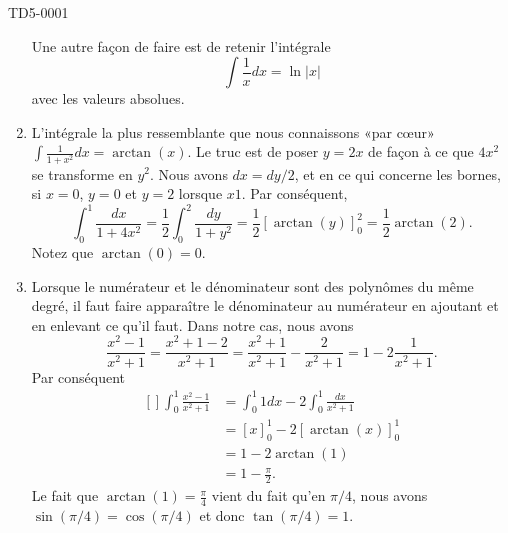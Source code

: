 \begin{corrige}{TD5-0001}
\begin{enumerate}
			Une autre façon de faire est de retenir l'intégrale
			\begin{equation}
				\int \frac{1}{ x }dx=\ln| x |
			\end{equation}
			avec les valeurs absolues.
		\item
			L'intégrale la plus ressemblante que nous connaissons «par cœur» $\int\frac{1}{ 1+x^2 }dx=\arctan(x)$. Le truc est de poser $y=2x$ de façon à ce que $4x^2$ se transforme en $y^2$. Nous avons $dx=dy/2$, et en ce qui concerne les bornes, si $x=0$, $y=0$ et $y=2$ lorsque $x1$. Par conséquent,
			\begin{equation}
				\int_0^1\frac{ dx }{ 1+4x^2 }=\frac{ 1 }{2}\int_0^2\frac{ dy }{ 1+y^2 }=\frac{ 1 }{2}\left[ \arctan(y) \right]_0^2=\frac{ 1 }{2}\arctan(2).
			\end{equation}
			Notez que $\arctan(0)=0$.
		\item
			Lorsque le numérateur et le dénominateur sont des polynômes du même degré, il faut faire apparaître le dénominateur au numérateur en ajoutant et en enlevant ce qu'il faut. Dans notre cas, nous avons 
			\begin{equation}
				\frac{ x^2-1 }{ x^2+1 }=\frac{ x^2+1-2 }{ x^2+1 }=\frac{ x^2+1 }{ x^2+1 }-\frac{ 2 }{ x^2+1 }=1-2\frac{ 1 }{ x^2+1 }.
			\end{equation}
			Par conséquent
			\begin{equation}
				\begin{aligned}[]
					\int_0^1\frac{ x^2-1 }{ x^2+1 }&=\int_0^1 1dx-2\int_0^1\frac{ dx }{ x^2+1 }\\
					&=[x]_0^1-2\left[ \arctan(x) \right]^1_0\\
					&=1-2\arctan(1)\\
					&=1-\frac{ \pi }{ 2 }.
				\end{aligned}
			\end{equation}
			Le fait que $\arctan(1)=\frac{ \pi }{ 4 }$ vient du fait qu'en $\pi/4$, nous avons $\sin(\pi/4)=\cos(\pi/4)$ et donc $\tan(\pi/4)=1$.


\end{enumerate}
\end{corrige}
